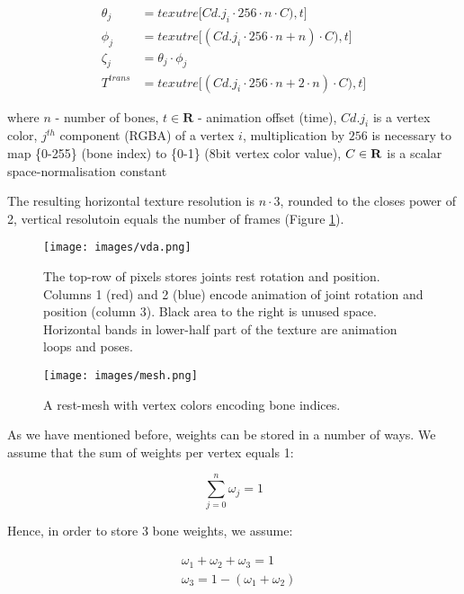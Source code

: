 \documentclass{acmsiggraph}
\begin{document}
\begin{equation}
  \begin{split}
  \theta_j & = texutre \lbrack Cd.j_i \cdot 256 \cdot n \cdot C), t\rbrack              \\
  \phi_j   & = texutre \lbrack (Cd.j_i \cdot 256 \cdot n + n) \cdot C), t\rbrack         \\
  \zeta_j  & = \theta_j \cdot \phi_j                                                    \\
  T^{trans} & = texutre \lbrack (Cd.j_i \cdot 256 \cdot n + 2 \cdot n) \cdot C), t\rbrack
  \end{split}
\end{equation}
  
where $n$ - number of bones, $t \in \textbf{R}$ - animation offset (time), $Cd.j_i$ is a vertex color, $j^{th}$ component (RGBA) of a vertex $i$, multiplication by $256$ is necessary to map \{0-255\} (bone index) to \{0-1\} (8bit vertex color value), $C\in\bold{R}$ is a scalar space-normalisation constant

The resulting horizontal texture resolution is $n \cdot 3$, rounded to the closes power of 2, vertical resolutoin equals the number of frames (Figure \ref{bones_texture}).

\begin{figure}[ht]
  \centering
  \texttt{[image: images/vda.png]}
  \caption{The top-row of pixels stores joints rest rotation and position.  Columns 1 (red) and 2 (blue) encode animation of joint rotation and position (column 3).  Black area to the right is unused space. Horizontal bands in lower-half part of the texture are animation loops and poses.}
  \label{bones_texture}
\end{figure}

\begin{figure}[ht]
  \centering
  \texttt{[image: images/mesh.png]}
  \caption{ A rest-mesh with vertex colors encoding bone indices.}
  \label{mesh_vertex_colors}
\end{figure}

As we have mentioned before, weights can be stored in a number of ways.  We assume that the sum of weights per vertex equals 1:

\begin{equation}
  \sum^n_{j=0} \omega_j = 1
\end{equation}

Hence, in order to store 3 bone weights, we assume:

\begin{align*}  
  &\omega_1 + \omega_2 + \omega_3 = 1 \\
  &\omega_3 = 1 - (\omega_1 + \omega_2)
\end{align*}  
\end{document}
